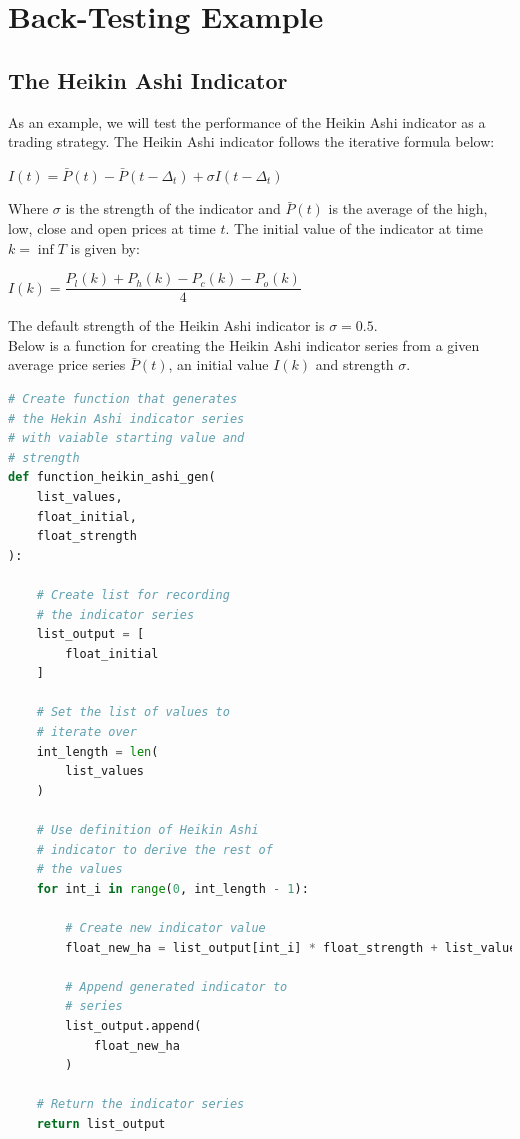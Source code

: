 \documentclass[11pt]{article}
\begin{document}
\section{Back-Testing Example}

\subsection{The Heikin Ashi Indicator}

As an example, we will test the performance of the Heikin Ashi indicator as a trading strategy. The Heikin Ashi indicator follows the iterative formula below:

\begin{center}
    $I(t) = \bar{P}(t) - \bar{P}(t - \Delta_t) + \sigma I(t - \Delta_t)$
\end{center}

Where $\sigma$ is the strength of the indicator and $\bar{P}(t)$ is the average of the high, low, close and open prices at time $t$. The initial value of the indicator at time $k = \inf{T}$ is given by:

\begin{center}
    $I(k) = \dfrac{P_l(k) + P_h(k) - P_c(k) - P_o(k)}{4}$
\end{center}

The default strength of the Heikin Ashi indicator is $\sigma = 0.5$.\\

Below is a function for creating the Heikin Ashi indicator series from a given average price series $\bar{P}(t)$, an initial value $I(k)$ and strength $\sigma$.

\begin{lstlisting}[language=Python]
# Create function that generates
# the Hekin Ashi indicator series
# with vaiable starting value and
# strength
def function_heikin_ashi_gen(
    list_values,
    float_initial,
    float_strength
):
    
    # Create list for recording
    # the indicator series
    list_output = [
        float_initial
    ]

    # Set the list of values to
    # iterate over
    int_length = len(
        list_values
    )

    # Use definition of Heikin Ashi
    # indicator to derive the rest of
    # the values
    for int_i in range(0, int_length - 1):

        # Create new indicator value
        float_new_ha = list_output[int_i] * float_strength + list_values[int_i + 1] - list_values[int_i]

        # Append generated indicator to
        # series
        list_output.append(
            float_new_ha
        )

    # Return the indicator series
    return list_output
\end{lstlisting}
\end{document}
